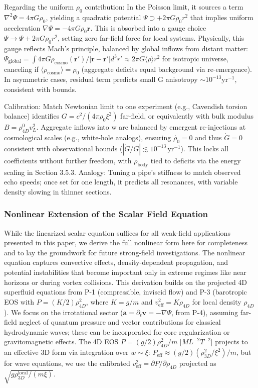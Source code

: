 \documentclass{article}
\begin{document}
Regarding the uniform $\rho_0$ contribution: In the Poisson limit, it sources a term $\nabla^2 \Psi = 4\pi G \rho_0$, yielding a quadratic potential $\Psi \supset +2\pi G \rho_0 r^2$ that implies uniform acceleration $\nabla \Psi = -4\pi G \rho_0 \mathbf{r}$. This is absorbed into a gauge choice $\Psi \to \Psi + 2\pi G \rho_0 r^2$, setting zero far-field force for local systems. Physically, this gauge reflects Mach's principle, balanced by global inflows from distant matter: $\Psi_{\text{global}} = \int 4\pi G \rho_{\text{cosmo}}(\mathbf{r}') / |\mathbf{r} - \mathbf{r}'| d^3 r' \approx 2\pi G \langle \rho \rangle r^2$ for isotropic universe, canceling if $\langle \rho_{\text{cosmo}} \rangle = \rho_0$ (aggregate deficits equal background via re-emergence). In asymmetric cases, residual term predicts small G anisotropy $\sim 10^{-13} \mathrm{yr}^{-1}$, consistent with bounds.

Calibration: Match Newtonian limit to one experiment (e.g., Cavendish torsion balance) identifies $G = c^2 / (4\pi \rho_0 \xi^2)$ far-field, or equivalently with bulk modulus $B = \rho_{4D}^0 v_L^2$. Aggregate inflows into w are balanced by emergent re-injections at cosmological scales (e.g., white-hole analogs), ensuring $\dot{\rho_0} = 0$ and thus $\dot{G} = 0$ consistent with observational bounds ($ |\dot{G}/G| \lesssim 10^{-13} \, \mathrm{yr}^{-1} $). This locks all coefficients without further freedom, with $\rho_{\text{body}}$ tied to deficits via the energy scaling in Section 3.5.3. Analogy: Tuning a pipe's stiffness to match observed echo speeds; once set for one length, it predicts all resonances, with variable density slowing in thinner sections.

\subsubsection{Nonlinear Extension of the Scalar Field Equation}

While the linearized scalar equation suffices for all weak-field applications presented in this paper, we derive the full nonlinear form here for completeness and to lay the groundwork for future strong-field investigations. The nonlinear equation captures convective effects, density-dependent propagation, and potential instabilities that become important only in extreme regimes like near horizons or during vortex collisions. This derivation builds on the projected 4D superfluid equations from P-1 (compressible, inviscid flow) and P-3 (barotropic EOS with $P = (K/2) \rho_{4D}^2$, where $K = g/m$ and $v_{\text{eff}}^2 = K \rho_{4D}$ for local density $\rho_{4D}$). We focus on the irrotational sector ($\mathbf{a} = \partial_t \mathbf{v} = -\nabla \Psi$, from P-4), assuming far-field neglect of quantum pressure and vector contributions for classical hydrodynamic waves; these can be incorporated for core regularization or gravitomagnetic effects. The 4D EOS $P = (g/2) \rho_{4D}^2 / m$ [$M L^{-2} T^{-2}$] projects to an effective 3D form via integration over $w \sim \xi$: $P_{\text{eff}} \approx (g/2) (\rho_{3D}^2 / \xi^2) / m$, but for wave equations, we use the calibrated $v_{\text{eff}}^2 = \partial P / \partial \rho_{4D}$ projected as $\sqrt{g \rho_{3D}^{\text{local}} / (m \xi)}$.
\end{document}
